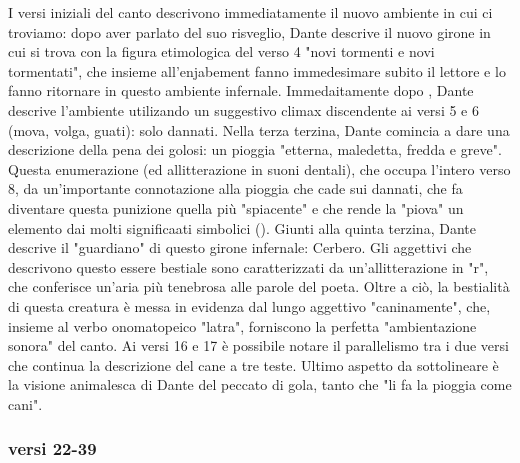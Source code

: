 \documentclass[10pt,a4paper]{article}
\begin{document}
	I versi iniziali del canto descrivono immediatamente il nuovo ambiente in cui ci troviamo: dopo aver parlato del suo risveglio, Dante descrive il nuovo girone in cui si trova con la figura etimologica del verso 4 "novi tormenti e novi tormentati", che insieme all'enjabement fanno immedesimare subito il lettore e lo fanno ritornare in questo ambiente infernale. Immedaitamente dopo , Dante descrive l'ambiente utilizando un suggestivo climax discendente ai versi 5 e 6 (mova, volga, guati): solo dannati. Nella terza terzina, Dante comincia a dare una descrizione della pena dei golosi: un pioggia "etterna, maledetta, fredda e greve". Questa enumerazione (ed allitterazione in suoni dentali), che occupa l'intero verso 8, da un'importante connotazione alla pioggia che cade sui dannati, che fa diventare questa punizione quella più "spiacente" e che rende la "piova" un elemento dai molti significaati simbolici (). Giunti alla quinta terzina, Dante descrive il "guardiano" di questo girone infernale: Cerbero. Gli aggettivi che descrivono questo essere bestiale sono caratterizzati da un'allitterazione in "r", che conferisce un'aria più tenebrosa alle parole del poeta. Oltre a ciò, la bestialità di questa creatura è messa in evidenza dal lungo aggettivo "caninamente", che, insieme al verbo onomatopeico "latra", forniscono la perfetta "ambientazione sonora" del canto. Ai versi 16 e 17 è possibile notare il parallelismo tra i due versi che continua la descrizione del cane a tre teste. Ultimo aspetto da sottolineare è la visione animalesca di Dante del peccato di gola, tanto che "li fa la pioggia come cani".
	
	\subsubsection{versi 22-39}
	
\end{document}
